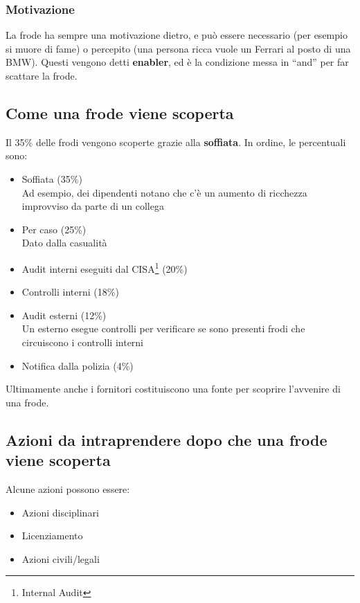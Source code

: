 \subsubsection{Motivazione}

La frode ha sempre una motivazione dietro, e può essere necessario (per esempio
si muore di fame) o percepito (una persona ricca vuole un Ferrari al posto di
una BMW). Questi vengono detti \textbf{enabler}, ed è la condizione messa in
``and'' per far scattare la frode.

\subsection{Come una frode viene scoperta}

Il 35\% delle frodi vengono scoperte grazie alla \textbf{soffiata}. In ordine,
le percentuali sono:
\begin{itemize}
  \item Soffiata (35\%) \\
  Ad esempio, dei dipendenti notano che c'è un aumento di ricchezza 
  improvviso da parte di un collega
  \item Per caso (25\%) \\
  Dato dalla casualità
  \item Audit interni eseguiti dal CISA\footnote{Internal Audit} (20\%)
  \item Controlli interni (18\%)
  \item Audit esterni (12\%) \\
  Un esterno esegue controlli per verificare se sono presenti frodi che
  circuiscono i controlli interni
  \item Notifica dalla polizia (4\%)
\end{itemize}

Ultimamente anche i fornitori costituiscono una fonte per scoprire l'avvenire 
di una frode.

\subsection{Azioni da intraprendere dopo che una frode viene scoperta}

Alcune azioni possono essere:
\begin{itemize}
  \item Azioni disciplinari
  \item Licenziamento
  \item Azioni civili/legali
\end{itemize}

